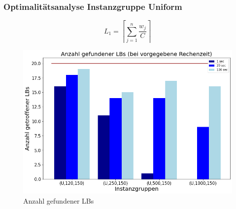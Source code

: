 \documentclass{beamer}
\begin{document}
\begin{frame}

\frametitle{Optimalitätsanalyse Instanzgruppe Uniform}
\begin{footnotesize}
\begin{equation}
L_1 = \left\lceil\sum_{j=1}^{n} \frac{w_j}{C}\right\rceil
\end{equation}
\end{footnotesize}


\begin{figure}[!htbp]
\begin{center}
\includegraphics[scale=0.3]{img/lb_unif.png}
\end{center}
\caption{Anzahl gefundener LBs}
\label{fig:architecture}
\end{figure}



\end{frame}
\end{document}
